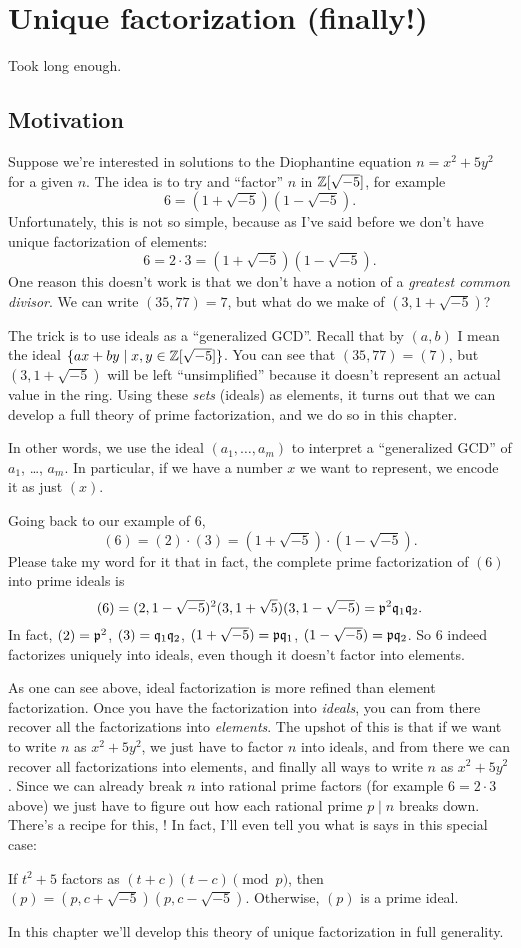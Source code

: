 \chapter{Unique factorization (finally!)}
Took long enough.

\section{Motivation}
Suppose we're interested in solutions to the
Diophantine equation $n = x^2 + 5y^2$ for a given $n$.
The idea is to try and ``factor'' $n$ in $\mathbb Z[\sqrt{-5}]$,
for example \[ 6 = (1+\sqrt{-5})(1-\sqrt{-5}). \]
Unfortunately, this is not so simple, because as I've said before
we don't have unique factorization of elements:
\[ 6 = 2 \cdot 3 = \left( 1+\sqrt{-5} \right)\left( 1-\sqrt{-5} \right). \]
One reason this doesn't work is that we don't have a notion of a
\emph{greatest common divisor}.
We can write $(35, 77) = 7$, but what do we make of $(3, 1+\sqrt{-5})$?

The trick is to use ideals as a ``generalized GCD''.
Recall that by $(a,b)$ I mean the ideal $\{ax + by \mid x,y \in \mathbb Z[\sqrt{-5}] \}$.
You can see that $(35, 77) = (7)$,
but $(3, 1+\sqrt{-5})$ will be left ``unsimplified'' because it doesn't
represent an actual value in the ring.
Using these \emph{sets} (ideals) as elements,
it turns out that we can develop a full theory
of prime factorization, and we do so in this chapter.

In other words, we use the ideal $(a_1, \dots, a_m)$
to interpret a ``generalized GCD'' of $a_1$, \dots, $a_m$.
In particular, if we have a number $x$ we want to represent,
we encode it as just $(x)$.

Going back to our example of $6$,
\[ (6) = (2) \cdot (3)
	= \left( 1+\sqrt{-5} \right) \cdot \left( 1-\sqrt{-5} \right). \]
Please take my word for it that in fact,
the complete prime factorization of $(6)$ into prime ideals is
\[
	(6)
	= (2,1-\sqrt{-5})^2 (3,1+\sqrt{5})(3,1-\sqrt{-5})
	= \mathfrak p^2 \mathfrak q_1 \mathfrak q_2. \]
In fact, $(2) = \mathfrak p^2$, $(3) = \mathfrak q_1 \mathfrak q_2$,
$(1+\sqrt{-5}) = \mathfrak p \mathfrak q_1$, $(1-\sqrt{-5}) = \mathfrak p \mathfrak q_2$.
So $6$ indeed factorizes uniquely into ideals,
even though it doesn't factor into elements.

As one can see above,
ideal factorization is more refined than element factorization.
Once you have the factorization into \emph{ideals},
you can from there recover all the factorizations into \emph{elements}.
The upshot of this is that if we want to write $n$ as $x^2+5y^2$,
we just have to factor $n$ into ideals,
and from there we can recover all factorizations into elements,
and finally all ways to write $n$ as $x^2+5y^2$.
Since we can already break $n$ into rational prime factors
(for example $6 = 2 \cdot 3$ above)
we just have to figure out how each rational prime $p \mid n$ breaks down.
There's a recipe for this, !
In fact, I'll even tell you what is says in this special case:
\begin{itemize}
	\ii If $t^2+5$ factors as $(t+c)(t-c) \pmod p$,
	then $(p) = (p, c+\sqrt{-5})(p, c-\sqrt{-5})$.
	\ii Otherwise, $(p)$ is a prime ideal.
\end{itemize}
In this chapter we'll develop this theory of unique factorization in full generality.

